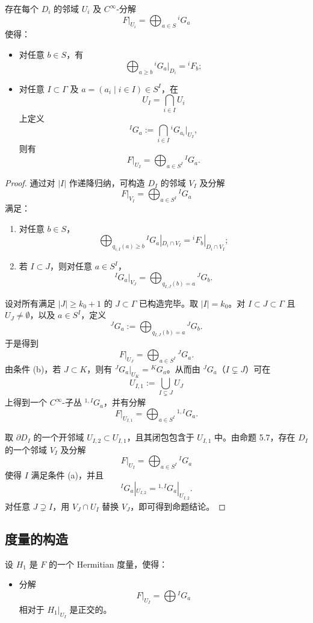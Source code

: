 \begin{proposition}
存在每个 \(D_i\) 的邻域 \(U_i\) 及 \(C^\infty\)-分解
\[
F|_{U_i}=\bigoplus_{a\in S} {}^iG_a
\]
使得：
\begin{itemize}
\item 对任意 \(b\in S\)，有
\[
\bigoplus_{a\ge b} {}^iG_a|_{D_i}={}^iF_b;
\]
\item 对任意 \(I\subset \Gamma\) 及 \(a=(a_i\mid i\in I)\in S^I\)，在
\[
U_I=\bigcap_{i\in I}U_i
\]
上定义
\[
{}^IG_a:=\bigcap_{i\in I} {}^iG_{a_i}|_{U_I},
\]
则有
\[
F|_{U_I}=\bigoplus_{a\in S^I} {}^IG_a.
\]
\end{itemize}
\end{proposition}

\begin{proof}
通过对 \(|I|\) 作递降归纳，可构造 \(D_I\) 的邻域 \(V_I\) 及分解
\[
F|_{V_I}=\bigoplus_{a\in S^I} {}^IG_a
\]
满足：
\begin{enumerate}[label=(\alph*)]
\item 对任意 \(b\in S\)，
\[
\bigoplus_{q_{i,I}(a)\ge b} {}^IG_a|_{D_i\cap V_I}
=
{}^iF_b|_{D_i\cap V_I};
\]
\item 若 \(I\subset J\)，则对任意 \(a\in S^I\)，
\[
{}^IG_a|_{V_J}
=
\bigoplus_{q_{I,J}(b)=a} {}^JG_b.
\]
\end{enumerate}

设对所有满足 \(|J|\ge k_0+1\) 的 \(J\subset \Gamma\) 已构造完毕。取 \(|I|=k_0\)。对 \(I\subset J\subset \Gamma\) 且 \(U_J\neq\emptyset\)，以及 \(a\in S^I\)，定义
\[
{}^JG_a:=\bigoplus_{q_{I,J}(b)=a} {}^JG_b.
\]
于是得到
\[
F|_{U_J}=\bigoplus_{a\in S^I} {}^JG_a.
\]
由条件 (b)，若 \(J\subset K\)，则有 \({}^JG_a|_{U_K}={}^KG_a\)。从而由 \({}^JG_a\)（\(I\subsetneq J\)）可在
\[
U_{I,1}:=\bigcup_{I\subsetneq J}U_J
\]
上得到一个 \(C^\infty\)-子丛 \({}^{1,I}G_a\)，并有分解
\[
F|_{U_{I,1}}=\bigoplus_{a\in S^I} {}^{1,I}G_a.
\]

取 \(\partial D_I\) 的一个开邻域 \(U_{I,2}\subset U_{I,1}\)，且其闭包包含于 \(U_{I,1}\) 中。由命题 5.7，存在 \(D_I\) 的一个邻域 \(V_I\) 及分解
\[
F|_{U_I}=\bigoplus_{a\in S^I} {}^IG_a
\]
使得 \(I\) 满足条件 (a)，并且
\[
{}^IG_a|_{U_{I,2}}={} ^{1,I}G_a|_{U_{I,2}}.
\]
对任意 \(J\supsetneq I\)，用 \(V_J\cap U_I\) 替换 \(V_J\)，即可得到命题结论。
\end{proof}

\subsection{度量的构造}

设 \(H_1\) 是 \(F\) 的一个 Hermitian 度量，使得：
\begin{itemize}
\item 分解
\[
F|_{U_I}=\bigoplus {}^IG_a
\]
相对于 \(H_1|_{U_I}\) 是正交的。
\end{itemize}

